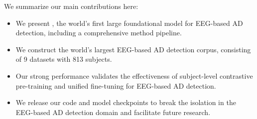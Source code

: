 We summarize our main contributions here: 
\vspace{-10mm}
\begin{itemize}[noitemsep, nolistsep]
    \item We present \name, the world’s first large foundational model for EEG-based AD detection, including a comprehensive method pipeline.
    \item We construct the world’s largest EEG-based AD detection corpus, consisting of 9 datasets with 813 subjects.
    \item Our strong performance validates the effectiveness of subject-level contrastive pre-training and unified fine-tuning for EEG-based AD detection.
    \item We release our code and model checkpoints to break the isolation in the EEG-based AD detection domain and facilitate future research. 
\end{itemize}


